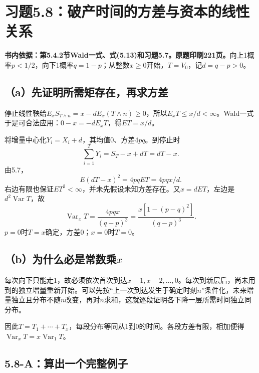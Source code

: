 \documentclass[11pt,a4paper,UTF8,fontset=fandol]{ctexart}
\begin{document}
\bigskip

\section{习题5.8：破产时间的方差与资本的线性关系}\label{ux4e60ux98985.8ux7834ux4ea7ux65f6ux95f4ux7684ux65b9ux5deeux4e0eux8d44ux672cux7684ux7ebfux6027ux5173ux7cfb}

\textbf{书内依据：第5.4.2节Wald一式、式(5.13)和习题5.7。原题印刷221页。}向上1概率\(p<1/2\)，向下1概率\(q=1-p\)；从整数\(x\ge0\)开始，\(T=V_0\)，记\(d=q-p>0\)。

\subsection{（a）先证明所需矩存在，再求方差}\label{aux5148ux8bc1ux660eux6240ux9700ux77e9ux5b58ux5728ux518dux6c42ux65b9ux5dee}

停止线性鞅给\(E_xS_{T\wedge n}=x-dE_x(T\wedge n)\ge0\)，所以\(E_xT\le x/d<\infty\)。Wald一式于是可合法应用：\(0-x=-dE_xT\)，得\(ET=x/d\)。

将增量中心化\(Y_i=X_i+d\)，其均值0、方差\(4pq\)。到停止时
\[\sum_{i=1}^TY_i=S_T-x+dT=dT-x.\] 由5.7， \[E(dT-x)^2=4pq ET=4pq x/d.\]
右边有限也保证\(ET^2<\infty\)，并未先假设未知方差存在。又\(x=dET\)，左边是\(d^2\operatorname{Var}T\)，故
\[\boxed{\operatorname{Var}_xT=\frac{4pq x}{(q-p)^3}
=\frac{x[1-(p-q)^2]}{(q-p)^3}.}\]
\(p=0\)时\(T=x\)确定，方差0；\(x=0\)时\(T=0\)。

\subsection{\texorpdfstring{（b）为什么必是常数乘\(x\)}{（b）为什么必是常数乘x}}\label{bux4e3aux4ec0ux4e48ux5fc5ux662fux5e38ux6570ux4e58x}

每次向下只能走1，故必须依次首次到达\(x-1,x-2,\ldots,0\)。每次到新层后，尚未用到的独立增量重新开始。可以先按``上一次到达发生于确定时刻\(n\)''条件化，未来增量独立且分布不随\(n\)改变，再对\(n\)求和，这就逐段证明各下降一层所需时间独立同分布。

因此\(T=T_1+\cdots+T_x\)，每段分布等同从1到0的时间。各段方差有限，相加便得\(\operatorname{Var}_xT=x\operatorname{Var}_1T\)。

\subsection{5.8-A：算出一个完整例子}\label{aux7b97ux51faux4e00ux4e2aux5b8cux6574ux4f8bux5b50}
\end{document}
